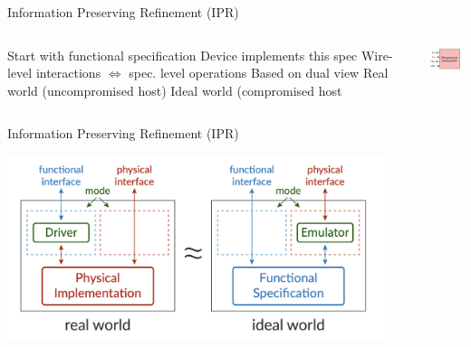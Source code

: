 \begin{frame}{Information Preserving Refinement (IPR)}
  \begin{columns}
  \begin{outline}
    \1 Start with functional specification 
    \1 Device implements this spec
    \1 Wire-level interactions $\iff$ spec. level operations 
    \1 Based on dual view
    \2 Real world (uncompromised host)
    \2 Ideal world (compromised host
  \end{outline}

  \centering
  \begin{center}
  
    \vspace{0.5cm}

    
    \includegraphics[width=3cm]{wire_diagram.png}
  \end{center}
\end{columns}
\end{frame}

\begin{frame}{Information Preserving Refinement (IPR)}
  \centering
  \begin{center}
    \includegraphics[width=11cm]{ipr.png}
  \end{center}

\end{frame}

